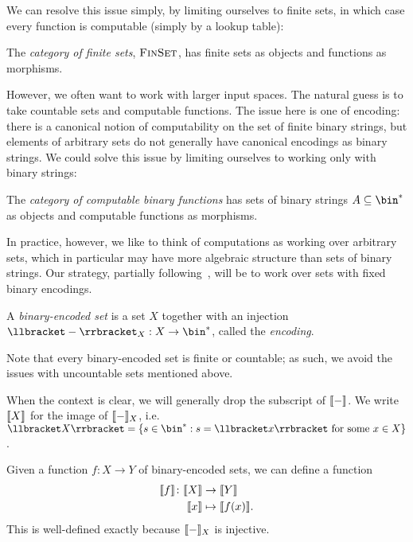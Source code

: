 We can resolve this issue simply, by limiting ourselves to finite sets, in which
case every function is computable (simply by a lookup table):

\begin{dfn}
  The \emph{category of finite sets}, ${\textsc{\text{FinSet}}}$, has finite sets as
  objects and functions as morphisms.
\end{dfn}

However, we often want to work with larger input spaces. The natural guess is to
take countable sets and computable functions. The issue here is one of encoding:
there is a canonical notion of computability on the set of finite binary
strings, but elements of arbitrary sets do not generally have canonical
encodings as binary strings. We could solve this issue by limiting
ourselves to working only with binary strings:
\begin{dfn}
  The \emph{category of computable binary functions}  has sets of binary strings
  $A\subseteq\bin^*$ as objects and computable functions as morphisms.
\end{dfn}

In practice, however, we like to think of computations as working over arbitrary
sets, which in particular may have more algebraic structure than sets of binary
strings. Our strategy, partially following~\cite{pavlovic-2014}, will be to work
over sets with fixed binary encodings.
\begin{dfn}
  A \emph{binary-encoded set} is a set $X$ together with an injection
  $\denote{-}_X: X\to\bin^*$, called the \emph{encoding}.
\end{dfn}

Note that every binary-encoded set is finite or countable; as such, we avoid the
issues with uncountable sets mentioned above.

\begin{ntn}
  When the context is clear, we will generally drop the subscript of
  $\llbracket - \rrbracket$. We write $\llbracket X \rrbracket$ for the image of $\llbracket - \rrbracket_X$, i.e.
  $\denote{X} = \{s\in\bin^*: s = \denote{x}\text{ for some }x\in X\}$.
\end{ntn}

Given a function $f: X\to Y$ of binary-encoded sets, we can define a function
  \begin{align*}
    \llbracket f \rrbracket \colon \llbracket X \rrbracket &\to \llbracket Y \rrbracket\\
    \llbracket x \rrbracket &\mapsto \llbracket f(x) \rrbracket.
  \end{align*}
This is well-defined exactly because $\llbracket - \rrbracket_X$ is injective.

